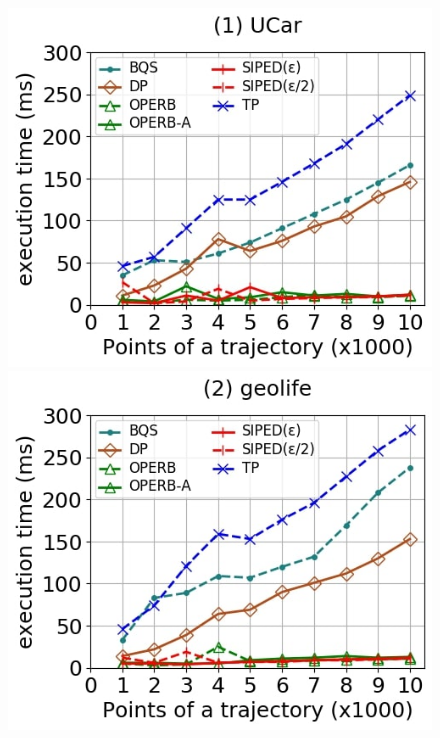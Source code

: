 {\begin{figure}[tb!]
	\centering
	\includegraphics[scale=0.250]{Figures/Exp-PED-time-size-service.jpg}	\hspace{0.5ex}
	\includegraphics[scale=0.250]{Figures/Exp-PED-time-size-geolife.jpg}	\hspace{0.5ex}

\end{figure}}
